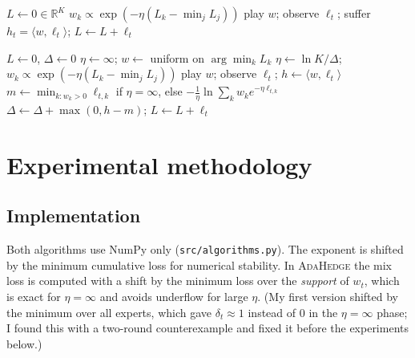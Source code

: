 \documentclass[11pt,a4paper]{article}
\newcommand{\Hedge}{\textsc{Hedge}}
\newcommand{\Ada}{\textsc{AdaHedge}}
\newcommand{\lnK}{\ln K}
\begin{document}
\begin{algorithm}[H]
\caption{\Hedge{} with fixed $\eta$}\label{alg:hedge}
\begin{algorithmic}[1]
\State $L\gets 0\in\mathbb R^K$
  \State $w_k\propto\exp(-\eta(L_k-\min_j L_j))$
  \State play $w$; observe $\ell_t$; suffer $h_t=\langle w,\ell_t\rangle$; $L\gets L+\ell_t$
\EndFor
\end{algorithmic}
\end{algorithm}
\thispagestyle{plain}
\begin{algorithm}[H]
\caption{\Ada{}}\label{alg:ada}
\begin{algorithmic}[1]
\State $L\gets0$, $\Delta\gets0$
   $\eta\gets\infty$; $w\gets$ uniform on $\arg\min_k L_k$
  \Else{} $\eta\gets\lnK/\Delta$; $w_k\propto\exp(-\eta(L_k-\min_jL_j))$
  \EndIf
  \State play $w$; observe $\ell_t$; $h\gets\langle w,\ell_t\rangle$
  \State $m\gets \min_{k:w_k>0}\ell_{t,k}$ if $\eta=\infty$, else $-\frac1\eta\ln\sum_k w_ke^{-\eta\ell_{t,k}}$
  \State $\Delta\gets\Delta+\max(0,h-m)$; $L\gets L+\ell_t$
\EndFor
\end{algorithmic}
\end{algorithm}

\section{Experimental methodology}\label{sec:method}
\subsection{Implementation}
Both algorithms use NumPy only (\texttt{src/algorithms.py}). The exponent is shifted by the minimum cumulative loss for numerical stability. In \Ada{} the mix loss is
computed with a shift by the minimum loss over the \emph{support} of $w_t$, which is exact for $\eta=\infty$ and avoids underflow for large $\eta$.
(My first version shifted by the minimum over all experts, which gave $\delta_t\approx1$ instead of $0$ in the $\eta=\infty$ phase; I found this with a two-round counterexample and fixed it before the experiments below.)
\end{document}
